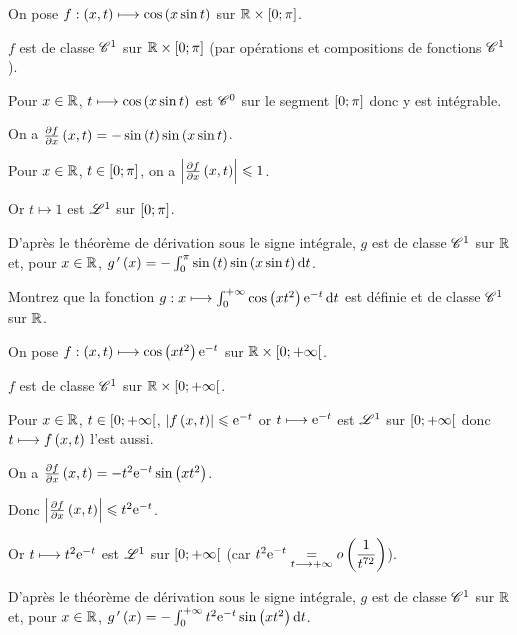 \begin{corr}
On pose \(f:\left(x,t\right)\longmapsto\cos\left(x\sin t\right)\) sur \(\mathbb{R}\times\left[0;\pi\right]\).

\(f\) est de classe \(\mathscr{C}^{1}\) sur \(\mathbb{R}\times\left[0;\pi\right]\) (par opérations et compositions de fonctions \(\mathscr{C}^{1}\)).

Pour \(x\in\mathbb{R}\), \(t\longmapsto\cos\left(x\sin t\right)\) est \(\mathscr{C}^{0}\) sur le segment \(\left[0;\pi\right]\) donc y est intégrable.

On a \(\pdv{f}{x}\left(x,t\right)=-\sin\left(t\right)\sin\left(x\sin t\right)\).

Pour \(x\in\mathbb{R}\), \(t\in\left[0;\pi\right]\), on a \(\left\lvert\pdv{f}{x}\left(x,t\right)\right\rvert\leqslant1\).

Or \(t\mapsto1\) est \(\integ{1}{}{}\) sur \(\left[0;\pi\right]\).

D'après le théorème de dérivation sous le signe intégrale, \(g\) est de classe \(\mathscr{C}^{1}\) sur \(\mathbb{R}\) et, pour \(x\in\mathbb{R}\), \(g\prim\paren{x}=-\int_0^\pi\sin\paren{t}\sin\paren{x\sin t}\odif{t}\).
\end{corr}

\begin{exo}
Montrez que la fonction \(g:x\mapsto\int_0^{\pinf}\cos\paren{xt^2}\e{-t}\odif{t}\) est définie et de classe \(\mathscr{C}^{1}\) sur \(\mathbb{R}\).
\end{exo}

\begin{corr}
On pose \(f:\left(x,t\right)\longmapsto\cos\left(xt^2\right)\mathrm{e}^{-t}\) sur \(\mathbb{R}\times\left[0;+\infty\right[\).

\(f\) est de classe \(\mathscr{C}^{1}\) sur \(\mathbb{R}\times\left[0;+\infty\right[\).

Pour \(x\in\mathbb{R}\), \(t\in\left[0;+\infty\right[\), \(\left\lvert f\left(x,t\right)\right\rvert\leqslant\mathrm{e}^{-t}\) or \(t\longmapsto\mathrm{e}^{-t}\) est \(\integ{1}{}{}\) sur \(\left[0;+\infty\right[\) donc \(t\longmapsto f\left(x,t\right)\) l'est aussi.

On a \(\pdv{f}{x}\left(x,t\right)=-t^2\mathrm{e}^{-t}\sin\left(xt^2\right)\).

Donc \(\left\lvert\pdv{f}{x}\left(x,t\right)\right\rvert\leqslant t^2\mathrm{e}^{-t}\).

Or \(t\longmapsto t^2\mathrm{e}^{-t}\) est \(\integ{1}{}{}\) sur \(\left[0;+\infty\right[\) (car \(t^2\mathrm{e}^{-t}\underset{t\longrightarrow+\infty}{=}o\left(\dfrac{1}{t^{72}}\right)\)).

D'après le théorème de dérivation sous le signe intégrale, \(g\) est de classe \(\mathscr{C}^{1}\) sur \(\mathbb{R}\) et, pour \(x\in\mathbb{R}\), \(g\prim\paren{x}=-\int_0^{\pinf}t^2\e{-t}\sin\paren{xt^2}\odif{t}\).
\end{corr}

